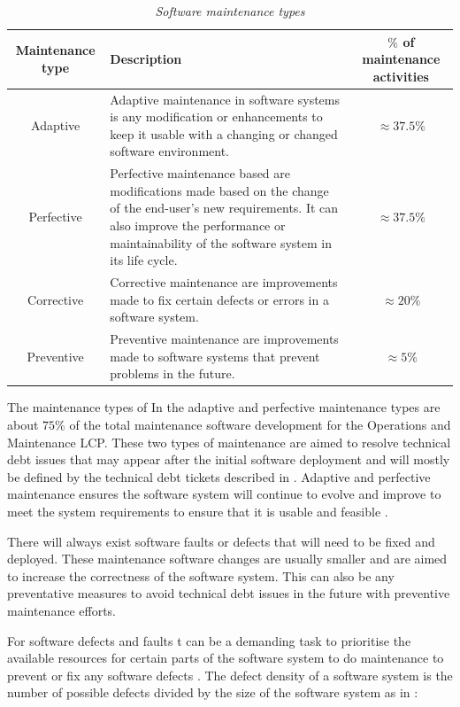 \begin{table}[!htb]
	\centering
	\caption[Software maintenance types]
	{\textit{Software maintenance types \cite{Ping2010,Hasan2012,Mamone1994}}}
	\label{tbl:ch1_maintenanceTypes}
	\begin{tabularx}{\textwidth}{|c|X|c|}
		\hline
		\textbf{Maintenance type} & \textbf{Description} & \textbf{$\%$ of maintenance activities} \\ \hline
		Adaptive & \raggedright Adaptive maintenance in software systems is any modification or enhancements to keep it usable with a changing or changed software environment. & $\approx 37.5\%$ \\ \hline
		Perfective & \raggedright Perfective maintenance based are modifications made based on the change of the end-user's new requirements. It can also improve the performance or maintainability of the software system in its life cycle. & $\approx 37.5\%$ \\ \hline
		Corrective & \raggedright Corrective maintenance are improvements made to fix certain defects or errors in a software system. & $\approx 20\%$ \\ \hline
		Preventive & \raggedright  Preventive maintenance are improvements made to software systems that prevent problems in the future. & $\approx 5\%$ \\ \hline
	\end{tabularx}
\end{table}

The maintenance types of  
In  the adaptive and perfective maintenance types are about $75\%$ of the total maintenance software development for the Operations and Maintenance LCP. These two types of maintenance are aimed to resolve technical debt issues that may appear after the initial software deployment and will mostly be defined by the technical debt tickets described in . Adaptive and perfective maintenance ensures the software system will continue to evolve and improve to meet the system requirements to ensure that it is usable and feasible \cite{Kumar2013}. \par There will always exist software faults or defects that will need to be fixed and deployed. These maintenance software changes are usually smaller and are aimed to increase the correctness of the software system. This can also be any preventative measures to avoid technical debt issues in the future with preventive maintenance efforts.\par For software defects and faults t can be a demanding task to prioritise the available resources for certain parts of the software system to do maintenance to prevent or fix any software defects \cite{Mamone1994, Hasan2012}.  The defect density of a software system is the number of possible defects divided by the size of the software system as in :


